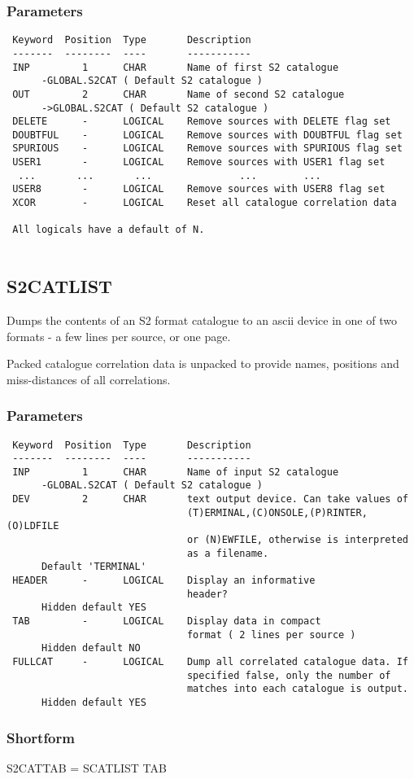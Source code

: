 \documentclass{book}
\renewcommand{\_}{{\tt\char'137}}     %
\begin{document}
\subsubsection{Parameters}
\begin{verbatim}
 Keyword  Position  Type       Description
 -------  --------  ----       -----------
 INP         1      CHAR       Name of first S2 catalogue
      -GLOBAL.S2CAT ( Default S2 catalogue )
 OUT         2      CHAR       Name of second S2 catalogue
      ->GLOBAL.S2CAT ( Default S2 catalogue )
 DELETE      -      LOGICAL    Remove sources with DELETE flag set
 DOUBTFUL    -      LOGICAL    Remove sources with DOUBTFUL flag set
 SPURIOUS    -      LOGICAL    Remove sources with SPURIOUS flag set
 USER1       -      LOGICAL    Remove sources with USER1 flag set
  ...       ...       ...               ...        ...
 USER8       -      LOGICAL    Remove sources with USER8 flag set
 XCOR        -      LOGICAL    Reset all catalogue correlation data
 
 All logicals have a default of N.
 
\end{verbatim}\subsection{S2CATLIST}
Dumps the contents of an S2 format catalogue to an ascii device in
one of two formats - a few lines per source, or one page.
 
Packed catalogue correlation data is unpacked to provide names,
positions and miss-distances of all correlations.
\subsubsection{Parameters}
\begin{verbatim}
 Keyword  Position  Type       Description
 -------  --------  ----       -----------
 INP         1      CHAR       Name of input S2 catalogue
      -GLOBAL.S2CAT ( Default S2 catalogue )
 DEV         2      CHAR       text output device. Can take values of
                               (T)ERMINAL,(C)ONSOLE,(P)RINTER,(O)LDFILE
                               or (N)EWFILE, otherwise is interpreted
                               as a filename.
      Default 'TERMINAL'
 HEADER      -      LOGICAL    Display an informative
                               header?
      Hidden default YES
 TAB         -      LOGICAL    Display data in compact
                               format ( 2 lines per source )
      Hidden default NO
 FULLCAT     -      LOGICAL    Dump all correlated catalogue data. If
                               specified false, only the number of
                               matches into each catalogue is output.
      Hidden default YES
\end{verbatim}\subsubsection{Shortform}
S2CATTAB = SCATLIST TAB
\end{document}
